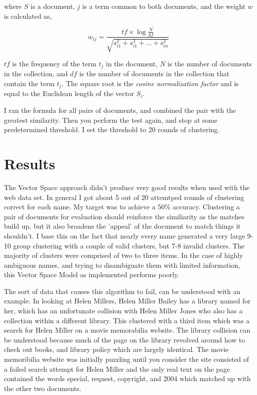 \documentclass[12pt,twoside,letterpaper]{article}
\begin{document}
where $S$ is a document, $j$ is a term common to both documents, and the weight $w$ is calculated as,

$$w_{ij} = \frac{tf \times \log{\frac{N}{df}}}{\sqrt{s_{i1}^2 + s_{i1}^2 + ... + s_{in}^2}}$$

$tf$ is the frequency of the term $t_j$ in the document, $N$ is the number of documents in the collection, and $df$ is the number of documents in the collection that contain the term $t_j$. The square root is the \textit{cosine normalization factor} and is equal to the Euclidean length of the vector $S_i$.

I ran the formula for all pairs of documents, and combined the pair with the greatest similarity. Then you perform the test again, and stop at some predetermined threshold. I set the threshold to 20 rounds of clustering.

\section{Results}
The Vector Space approach didn't produce very good results when used with the web data set. In general I got about 5 out of 20 attemtped rounds of clustering correct for each name. My target was to achieve a 50\% accuracy. Clustering a pair of documents for evaluation should reinforce the similiarity as the matches build up, but it also broadens the 'appeal' of the document to match things it shouldn't. I base this on the fact that nearly every name generated a very large 9-10 group clustering with a couple of valid clusters, but 7-8 invalid clusters. The majority of clusters were comprised of two to three items. In the case of highly ambiguous names, and trying to disambiguate them with limited information, this Vector Space Model as implemented performs poorly.

The sort of data that causes this algorithm to fail, can be understood with an example. In looking at Helen Millers, Helen Miller Bailey has a library named for her, which has an unfortunate collision with Helen Miller Jones who also has a collection within a different library. This clustered with a third item which was a search for Helen Miller on a movie memorabilia website. The library collision can be understood because much of the page on the library revolved around how to check out books, and library policy which are largely identical. The movie memoribilia website was initially puzzling until you consider the site consisted of a failed search attempt for Helen Miller and the only real text on the page contained the words special, request, copyright, and 2004 which matched up with the other two documents.
\end{document}

